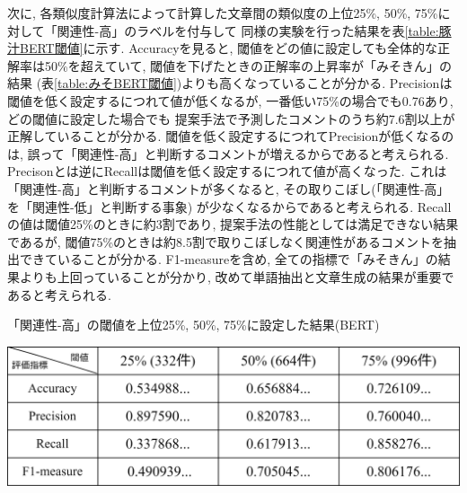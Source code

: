\documentclass{ltjarticle}
\begin{document}
\newpage
次に, 各類似度計算法によって計算した文章間の類似度の上位25\%, 50\%, 75\%に対して「関連性-高」のラベルを付与して
同様の実験を行った結果を表\ref{table:豚汁BERT閾値}に示す. 
Accuracyを見ると, 閾値をどの値に設定しても全体的な正解率は50\%を超えていて, 閾値を下げたときの正解率の上昇率が「みそきん」の結果
(表\ref{table:みそBERT閾値})よりも高くなっていることが分かる. 
Precisionは閾値を低く設定するにつれて値が低くなるが, 一番低い75\%の場合でも0.76あり, どの閾値に設定した場合でも
提案手法で予測したコメントのうち約7.6割以上が正解していることが分かる. 
閾値を低く設定するにつれてPrecisionが低くなるのは, 誤って「関連性-高」と判断するコメントが増えるからであると考えられる. 
Precisonとは逆にRecallは閾値を低く設定するにつれて値が高くなった. 
これは「関連性-高」と判断するコメントが多くなると, その取りこぼし(「関連性-高」を「関連性-低」と判断する事象)
が少なくなるからであると考えられる. 
Recallの値は閾値25\%のときに約3割であり, 提案手法の性能としては満足できない結果であるが, 
閾値75\%のときは約8.5割で取りこぼしなく関連性があるコメントを抽出できていることが分かる. 
F1-measureを含め, 全ての指標で「みそきん」の結果よりも上回っていることが分かり, 改めて単語抽出と文章生成の結果が重要であると考えられる. 
\begin{table}[ht]
    \centering
    \caption{「関連性-高」の閾値を上位25\%, 50\%, 75\%に設定した結果(BERT)}
    \vspace{5truept}

    \includegraphics[width = 13.5cm]{images/豚汁images/豚汁BERT閾値.drawio.png}
    \label{table:豚汁BERT閾値}
\end{table}
\vspace{10truept}
\end{document}
